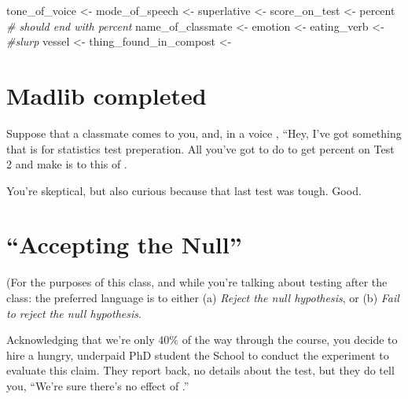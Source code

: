 \documentclass[
]{book}
\newenvironment{Shaded}{\begin{snugshade}}{\end{snugshade}}
\newcommand{\CommentTok}[1]{\textcolor[rgb]{0.56,0.35,0.01}{\textit{#1}}}
\newcommand{\NormalTok}[1]{#1}
\newcommand{\OtherTok}[1]{\textcolor[rgb]{0.56,0.35,0.01}{#1}}
\newcommand{\StringTok}[1]{\textcolor[rgb]{0.31,0.60,0.02}{#1}}
\theoremstyle{definition}
\theoremstyle{definition}
\theoremstyle{definition}
\theoremstyle{definition}
\theoremstyle{remark}
\begin{document}
\begin{Shaded}
\begin{Highlighting}[]
\NormalTok{tone\_of\_voice     }\OtherTok{\textless{}{-}} \StringTok{\textquotesingle{}\textquotesingle{}}
\NormalTok{mode\_of\_speech    }\OtherTok{\textless{}{-}} \StringTok{\textquotesingle{}\textquotesingle{}}
\NormalTok{superlative       }\OtherTok{\textless{}{-}} \StringTok{\textquotesingle{}\textquotesingle{}}
\NormalTok{score\_on\_test     }\OtherTok{\textless{}{-}} \StringTok{\textquotesingle{}percent\textquotesingle{}} \CommentTok{\# should end with percent}
\NormalTok{name\_of\_classmate }\OtherTok{\textless{}{-}} \StringTok{\textquotesingle{}\textquotesingle{}}
\NormalTok{emotion           }\OtherTok{\textless{}{-}} \StringTok{\textquotesingle{}\textquotesingle{}}
\NormalTok{eating\_verb       }\OtherTok{\textless{}{-}} \StringTok{\textquotesingle{}\textquotesingle{}} \CommentTok{\#slurp}
\NormalTok{vessel            }\OtherTok{\textless{}{-}} \StringTok{\textquotesingle{}\textquotesingle{}} 
\NormalTok{thing\_found\_in\_compost }\OtherTok{\textless{}{-}} \StringTok{\textquotesingle{}\textquotesingle{}}
\end{Highlighting}
\end{Shaded}

\hypertarget{madlib-completed}{%
\section{Madlib completed}\label{madlib-completed}}

Suppose that a classmate comes to you, and, in a voice , ``Hey, I've got something that is for statistics test preperation. All you've got to do to get percent on Test 2 and make is to this of .

You're skeptical, but also curious because that last test was tough. Good.

\hypertarget{accepting-the-null}{%
\section{``Accepting the Null''}\label{accepting-the-null}}

(For the purposes of this class, and while you're talking about testing after the class: the preferred language is to either (a) \emph{Reject the null hypothesis}, or (b) \emph{Fail to reject the null hypothesis}.

Acknowledging that we're only 40\% of the way through the course, you decide to hire a hungry, underpaid PhD student the School to conduct the experiment to evaluate this claim. They report back, no details about the test, but they do tell you, ``We're sure there's no effect of .''
\end{document}
